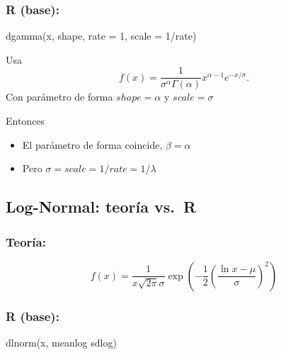 \documentclass[
  letterpaper,
  DIV=11,
  numbers=noendperiod]{scrartcl}
\newenvironment{Shaded}{\begin{snugshade}}{\end{snugshade}}
\newcommand{\AttributeTok}[1]{\textcolor[rgb]{0.40,0.45,0.13}{#1}}
\newcommand{\DecValTok}[1]{\textcolor[rgb]{0.68,0.00,0.00}{#1}}
\newcommand{\FunctionTok}[1]{\textcolor[rgb]{0.28,0.35,0.67}{#1}}
\newcommand{\NormalTok}[1]{\textcolor[rgb]{0.00,0.23,0.31}{#1}}
\newcommand{\SpecialCharTok}[1]{\textcolor[rgb]{0.37,0.37,0.37}{#1}}
\providecommand{\tightlist}{%
  \setlength{\itemsep}{0pt}\setlength{\parskip}{0pt}}
\begin{document}
\subsubsection{\texorpdfstring{\textbf{R
(base)}:}{R (base):}}\label{r-base-1}

\begin{Shaded}
\begin{Highlighting}[]
\FunctionTok{dgamma}\NormalTok{(x, shape, }\AttributeTok{rate =} \DecValTok{1}\NormalTok{, }\AttributeTok{scale =} \DecValTok{1}\SpecialCharTok{/}\NormalTok{rate)}
\end{Highlighting}
\end{Shaded}

Usa
\[f(x)=\frac{1}{\sigma^{\alpha}\Gamma(\alpha)}x^{\alpha-1}e^{-x/\sigma}.\]
Con parámetro de forma \(shape=\alpha\) y \(scale=\sigma\)

Entonces

\begin{itemize}
\tightlist
\item
  El parámetro de forma coincide, \(\beta =\alpha\)
\item
  Pero \(\sigma = scale = 1 / rate = 1/\lambda\)
\end{itemize}

\subsection{Log-Normal: teoría vs.~R}\label{log-normal-teoruxeda-vs.-r}

\subsubsection{\texorpdfstring{\textbf{Teoría}:}{Teoría:}}\label{teoruxeda-2}

\[
f(x) = \frac{1}{x \sqrt{2\pi}\sigma} \exp\left( -\frac{1}{2} \left( \frac{\ln x - \mu}{\sigma} \right)^2 \right)
\]

\subsubsection{\texorpdfstring{\textbf{R
(base)}:}{R (base):}}\label{r-base-2}

\begin{Shaded}
\begin{Highlighting}[]
\FunctionTok{dlnorm}\NormalTok{(x, meanlog  sdlog)}
\end{Highlighting}
\end{Shaded}
\end{document}
